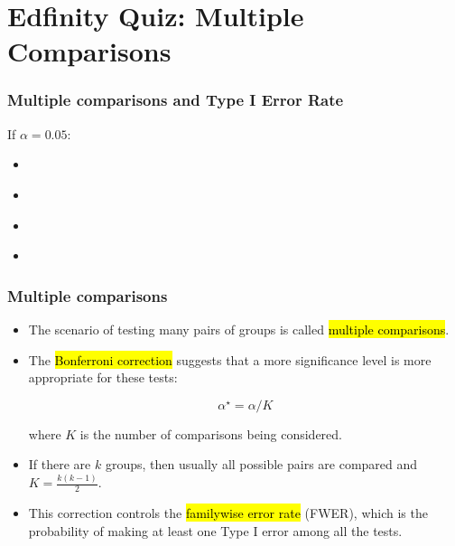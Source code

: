 \documentclass[slidestop,compress,mathserif]{beamer}
\newcommand{\soln}[1]{\textit{#1}}
\begin{document}

\section{Edfinity Quiz: Multiple Comparisons}


\begin{frame}
\frametitle{Multiple comparisons and Type I Error Rate}
If $\alpha=0.05$:
\begin{itemize}
\item {} \soln{ }
\item {} \soln{ }
\item {} \soln{\only<4-5>{ $1 - (1 - 0.05)^{100} \approx 0.994$ (99.4\%) } }
\item {} \soln{ }
\end{itemize}


\end{frame}


\begin{frame}
\frametitle{Multiple comparisons}

\begin{itemize}

\item The scenario of testing many pairs of groups is called \hl{multiple comparisons}.

\pause

\item The \hl{Bonferroni correction} suggests that a more  significance level is more appropriate for these tests:

\[ \alpha^\star = \alpha / K \]

where $K$ is the number of comparisons being considered.

\pause

\item If there are $k$ groups, then usually all possible pairs are compared and $K = \frac{k (k - 1)}{2}$.

\pause

\item This correction controls the \hl{familywise error rate} (FWER), which is the probability of making at least one Type I error among all the tests.

\end{itemize}

\end{frame}
\end{document}
